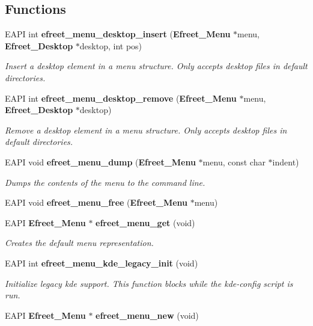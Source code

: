 \subsection*{Functions}
\begin{CompactItemize}
\item 
EAPI int {\bf efreet\_\-menu\_\-desktop\_\-insert} ({\bf Efreet\_\-Menu} $\ast$menu, {\bf Efreet\_\-Desktop} $\ast$desktop, int pos)
\begin{CompactList}\small\item\em Insert a desktop element in a menu structure. Only accepts desktop files in default directories. \item\end{CompactList}\item 
EAPI int {\bf efreet\_\-menu\_\-desktop\_\-remove} ({\bf Efreet\_\-Menu} $\ast$menu, {\bf Efreet\_\-Desktop} $\ast$desktop)
\begin{CompactList}\small\item\em Remove a desktop element in a menu structure. Only accepts desktop files in default directories. \item\end{CompactList}\item 
EAPI void {\bf efreet\_\-menu\_\-dump} ({\bf Efreet\_\-Menu} $\ast$menu, const char $\ast$indent)
\begin{CompactList}\small\item\em Dumps the contents of the menu to the command line. \item\end{CompactList}\item 
EAPI void {\bf efreet\_\-menu\_\-free} ({\bf Efreet\_\-Menu} $\ast$menu)
\item 
EAPI {\bf Efreet\_\-Menu} $\ast$ {\bf efreet\_\-menu\_\-get} (void)
\begin{CompactList}\small\item\em Creates the default menu representation. \item\end{CompactList}\item 
EAPI int {\bf efreet\_\-menu\_\-kde\_\-legacy\_\-init} (void)
\begin{CompactList}\small\item\em Initialize legacy kde support. This function blocks while the kde-config script is run. \item\end{CompactList}\item 
EAPI {\bf Efreet\_\-Menu} $\ast$ {\bf efreet\_\-menu\_\-new} (void)

\end{CompactItemize}
